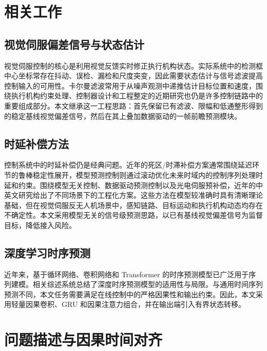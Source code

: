 \documentclass[journal]{IEEEtran}
\begin{document}
\section{相关工作}
\subsection{视觉伺服偏差信号与状态估计}
视觉伺服控制的核心是利用视觉反馈实时修正执行机构状态\cite{chaumette2006visual,hutchinson1996tutorial}。实际系统中的检测框中心坐标常存在抖动、误检、漏检和尺度突变，因此需要状态估计与信号滤波提高控制输入的可用性。卡尔曼滤波\cite{kalman1960new,welch1995introduction}常用于从噪声观测中递推估计目标位置和速度，围绕执行机构约束处理、控制器设计和工程整定的近期研究也仍是许多控制链路中的重要组成部分\cite{liu2003advancedpid}。本文继承这一工程思路：首先保留已有滤波、限幅和低通整形得到的稳定基线视觉偏差信号，然后在其上叠加数据驱动的一帧前瞻预测模块。

\subsection{时延补偿方法}
控制系统中的时延补偿仍是经典问题。近年的死区/时滞补偿方案\cite{smith1957closer}通常围绕延迟环节的鲁棒稳定性展开，模型预测控制\cite{camacho2013model}则通过滚动优化未来时域内的控制序列处理时延和约束。围绕模型无关控制、数据驱动预测控制以及光电伺服预补偿，近年的中英文研究给出了不同场景下的工程化方案\cite{normey2009taking,xi2013mpc_cn,li2006saturatedmpc_cn,chen2007timedelaympc_cn}。这些方法在模型较准确时具有清晰理论基础，但在视觉伺服反无人机场景中，感知链路、目标运动和执行机构动态均存在不确定性。本文采用模型无关的信号级预测思路，以已有基线视觉偏差信号为监督目标，降低接入风险。

\subsection{深度学习时序预测}
近年来，基于循环网络、卷积网络和 Transformer 的时序预测模型已广泛用于序列建模\cite{hochreiter1997long,cho2014learning,bai2018empirical,oord2016wavenet,qin2017darnn,lim2021tft,vaswani2017attention,wen2023transformers}。相关综述系统总结了深度时序预测模型的适用性与局限\cite{lecun2015deep}。与通用时间序列预测不同，本文任务需要满足在线控制中的严格因果性和输出约束。因此，本文采用轻量因果卷积、GRU 和因果注意力组合，并在输出端引入有界状态转移。

\section{问题描述与因果时间对齐}
\end{document}
